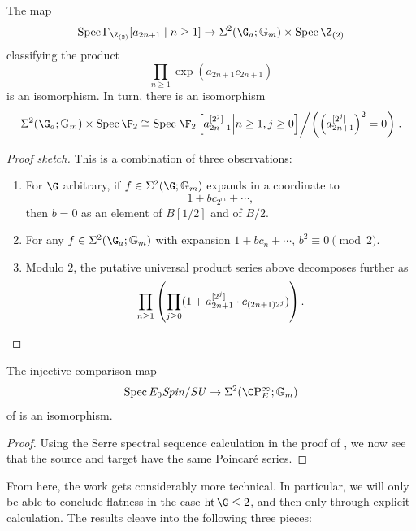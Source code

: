 \begin{lemma}
The map \[\Spec \Gamma_{\Z_{(2)}}[a_{2n + 1} \mid n \ge 1] \to \Sigma^2(\G_a; \Gm) \times \Spec \Z_{(2)}\] classifying the product \[\prod_{n \ge 1} \exp(a_{2n+1} c_{2n+1})\] is an isomorphism.
In turn, there is an isomorphism \[\Sigma^2(\G_a; \Gm) \times \Spec \F_2 \cong \Spec \left.\F_2\left[a_{2n+1}^{[2^j]} \middle| n \ge 1, j \ge 0\right] \middle/ \left(\left(a_{2n+1}^{[2^j]}\right)^2 = 0\right)\right. .\]
\end{lemma}
\begin{proof}[Proof sketch]
This is a combination of three observations:
\begin{enumerate}
    \item For \(\G\) arbitrary, if \(f \in \Sigma^2(\G; \Gm)\) expands in a coordinate to \[1 + b c_{2^m} + \cdots,\] then \(b = 0\) as an element of \(B[1/2]\) and of \(B/2\).
    \item For any \(f \in \Sigma^2(\G_a; \Gm)\) with expansion \(1 + b c_n + \cdots\), \(b^2 \equiv 0 \pmod{2}\).
    \item Modulo \(2\), the putative universal product series above decomposes further as \[\prod_{n \ge 1} \left(\prod_{j \ge 0} (1 + a_{2n+1}^{[2^j]} \cdot c_{(2n+1)2^j})\right). \qedhere\]
\end{enumerate}
\end{proof}

\begin{corollary}
The injective comparison map \[\Spec E_0 \Spin/\SU \to \Sigma^2(\CP^\infty_E; \Gm)\] of  is an isomorphism.
\end{corollary}
\begin{proof}
Using the Serre spectral sequence calculation in the proof of , we now see that the source and target have the same Poincar\'e series.
\end{proof}

From here, the work gets considerably more technical.
In particular, we will only be able to conclude flatness in the case \(\height \G \le 2\), and then only through explicit calculation.
The results cleave into the following three pieces:


